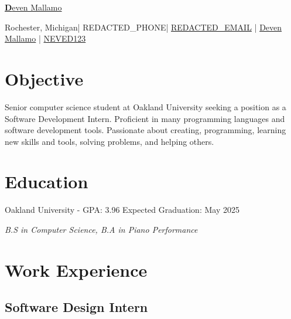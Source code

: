 \documentclass{article}
\newcommand{\resumesection}[1]{
	\section*{\Large\textbf{#1}}
	\hrulefill
	\vspace{1ex}
}
\newcommand{\name}{Deven Mallamo}
\newcommand{\address}{Rochester, Michigan}
\newcommand{\phone}{REDACTED_PHONE}
\newcommand{\email}{REDACTED_EMAIL}
\newcommand{\linkedin}{Deven Mallamo}
\newcommand{\github}{NEVED123}
\begin{document}
\begin{tcolorbox}[colback= boxfill,colframe=boxframe]
	\begin{center}
		\vspace{5pt}
		\href{https://www.devenmallamo.com}{\Huge \textbf \name} 

		\normalsize \vspace{10pt}

		\faHome \space \address \space | 
		\faPhone \space \phone \space |
		\href{mailto:\email}{\faEnvelope \space \email} \space | 
		\href{https://www.linkedin.com/in/deven-mallamo/}{\faLinkedin \space \linkedin} \space | 
		\href{https://github.com/NEVED123}{\faGithub \space \github} 
	\end{center}
\end{tcolorbox}

\vspace{1ex}

\resumesection{Objective}

\vspace{.2ex}	

Senior computer science student at Oakland University seeking a position as a Software Development Intern. Proficient in many programming languages and software development tools. Passionate about creating, programming, \hspace{49152sp}learning new skills and tools, solving problems, and helping others.

\vspace{.5ex}	


\resumesection{Education}

\vspace{.2ex}	

Oakland University - GPA: 3.96 \hfill Expected Graduation: May 2025

\textit {B.S in Computer Science, B.\hspace{49152sp}A in Piano Performance} 

\vspace{.5ex}


\resumesection{Work Experience}

\subsection*{Software Design Intern} 
\end{document}
